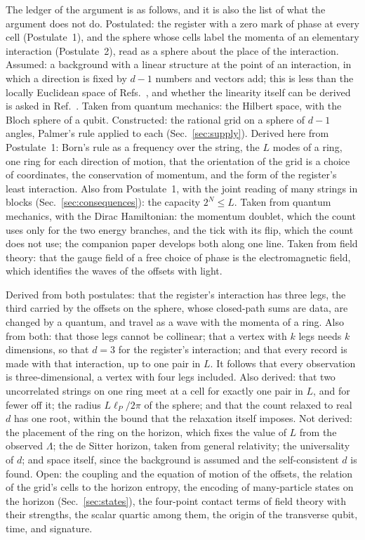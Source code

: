 \documentclass[aps,prd,twocolumn,superscriptaddress,nofootinbib]{revtex4-2}
\begin{document}
The ledger of the argument is as follows, and it is also the list of what the argument does not do. Postulated: the register with a zero mark of phase at every cell (Postulate~1), and the sphere whose cells label the momenta of an elementary interaction (Postulate~2), read as a sphere about the place of the interaction. Assumed: a background with a linear structure at the point of an interaction, in which a direction is fixed by $d-1$ numbers and vectors add; this is less than the locally Euclidean space of Refs.~\cite{muller2013,dakic2016}, and whether the linearity itself can be derived is asked in Ref.~\cite{muller2017}. Taken from quantum mechanics: the Hilbert space, with the Bloch sphere of a qubit. Constructed: the rational grid on a sphere of $d-1$ angles, Palmer's rule applied to each (Sec.~\ref{sec:supply}). Derived here from Postulate~1: Born's rule as a frequency over the string, the $L$ modes of a ring, one ring for each direction of motion, that the orientation of the grid is a choice of coordinates, the conservation of momentum, and the form of the register's least interaction. Also from Postulate~1, with the joint reading of many strings in blocks (Sec.~\ref{sec:consequences}): the capacity $2^N \le L$. Taken from quantum mechanics, with the Dirac Hamiltonian: the momentum doublet, which the count uses only for the two energy branches, and the tick with its flip, which the count does not use; the companion paper develops both along one line. Taken from field theory: that the gauge field of a free choice of phase is the electromagnetic field, which identifies the waves of the offsets with light.

Derived from both postulates: that the register's interaction has three legs, the third carried by the offsets on the sphere, whose closed-path sums are data, are changed by a quantum, and travel as a wave with the momenta of a ring. Also from both: that those legs cannot be collinear; that a vertex with $k$ legs needs $k$ dimensions, so that $d = 3$ for the register's interaction; and that every record is made with that interaction, up to one pair in $L$. It follows that every observation is three-dimensional, a vertex with four legs included. Also derived: that two uncorrelated strings on one ring meet at a cell for exactly one pair in $L$, and for fewer off it; the radius $L\ell_P/2\pi$ of the sphere; and that the count relaxed to real $d$ has one root, within the bound that the relaxation itself imposes. Not derived: the placement of the ring on the horizon, which fixes the value of $L$ from the observed $\Lambda$; the de Sitter horizon, taken from general relativity; the universality of $d$; and space itself, since the background is assumed and the self-consistent $d$ is found. Open: the coupling and the equation of motion of the offsets, the relation of the grid's cells to the horizon entropy, the encoding of many-particle states on the horizon (Sec.~\ref{sec:states}), the four-point contact terms of field theory with their strengths, the scalar quartic among them, the origin of the transverse qubit, time, and signature.
\end{document}
